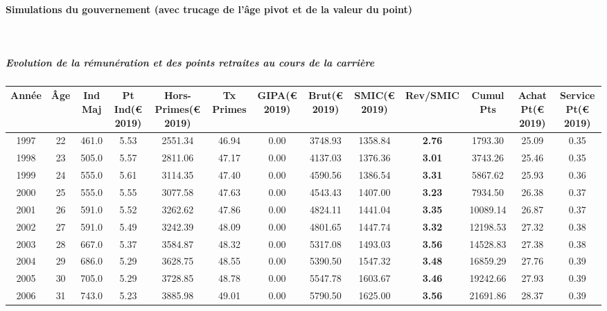 \paragraph{Simulations du gouvernement (avec trucage de l'âge pivot et de la valeur du point)}  ~\\ 
 
\subparagraph{Evolution de la rémunération et des points retraites au cours de la carrière} 
 
{ \scriptsize \begin{center} 
\begin{tabular}[htb]{|c|c||c|c|c|c|c|c||c|c||c|c|c||} 
\hline 
 Année &  Âge &  Ind Maj &  Pt Ind(\euro{} 2019) &   Hors-Primes(\euro{} 2019) &  Tx Primes &  GIPA(\euro{} 2019) &  Brut(\euro{} 2019) &  SMIC(\euro{} 2019) &  Rev/SMIC &  Cumul Pts &  Achat Pt(\euro{} 2019) &  Service Pt(\euro{} 2019) \\ 
\hline \hline 
 1997 &  22 &  461.0 &  5.53 &  2551.34 &  46.94 &  0.00 &  3748.93 &  1358.84 &  {\bf 2.76} &  1793.30 &  25.09 &  0.35 \\ 
\hline 
 1998 &  23 &  505.0 &  5.57 &  2811.06 &  47.17 &  0.00 &  4137.03 &  1376.36 &  {\bf 3.01} &  3743.26 &  25.46 &  0.35 \\ 
\hline 
 1999 &  24 &  555.0 &  5.61 &  3114.35 &  47.40 &  0.00 &  4590.56 &  1386.54 &  {\bf 3.31} &  5867.62 &  25.93 &  0.36 \\ 
\hline 
 2000 &  25 &  555.0 &  5.55 &  3077.58 &  47.63 &  0.00 &  4543.43 &  1407.00 &  {\bf 3.23} &  7934.50 &  26.38 &  0.37 \\ 
\hline 
 2001 &  26 &  591.0 &  5.52 &  3262.62 &  47.86 &  0.00 &  4824.11 &  1441.04 &  {\bf 3.35} &  10089.14 &  26.87 &  0.37 \\ 
\hline 
 2002 &  27 &  591.0 &  5.49 &  3242.39 &  48.09 &  0.00 &  4801.65 &  1447.74 &  {\bf 3.32} &  12198.53 &  27.32 &  0.38 \\ 
\hline 
 2003 &  28 &  667.0 &  5.37 &  3584.87 &  48.32 &  0.00 &  5317.08 &  1493.03 &  {\bf 3.56} &  14528.83 &  27.38 &  0.38 \\ 
\hline 
 2004 &  29 &  686.0 &  5.29 &  3628.75 &  48.55 &  0.00 &  5390.50 &  1547.32 &  {\bf 3.48} &  16859.29 &  27.76 &  0.39 \\ 
\hline 
 2005 &  30 &  705.0 &  5.29 &  3728.85 &  48.78 &  0.00 &  5547.78 &  1603.67 &  {\bf 3.46} &  19242.66 &  27.93 &  0.39 \\ 
\hline 
 2006 &  31 &  743.0 &  5.23 &  3885.98 &  49.01 &  0.00 &  5790.50 &  1625.00 &  {\bf 3.56} &  21691.86 &  28.37 &  0.39 \\ 

\end{tabular}
\end{center}}
